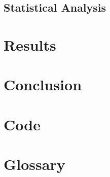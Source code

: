 \documentclass[draft]{article}
\begin{document}
\subsection{Statistical Analysis}
\section{Results}
\section{Conclusion}

\newpage



\newpage
\begin{appendices}
    \section{Code}
    \section{Glossary}
\end{appendices}
\end{document}
